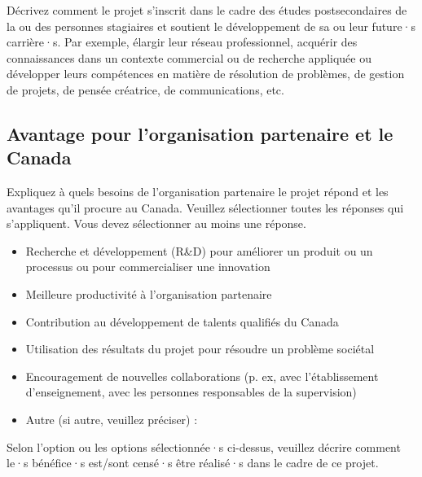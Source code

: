 \documentclass{mitacs-acceleration}
\begin{document}
\subsubsection{}\begin{instructions}
Décrivez comment le projet s'inscrit dans le cadre des études postsecondaires de la ou des personnes stagiaires et soutient le développement de sa ou leur future·s carrière·s. Par exemple, élargir leur réseau professionnel, acquérir des connaissances dans un contexte commercial ou de recherche appliquée ou développer leurs compétences en matière de résolution de problèmes, de gestion de projets, de pensée créatrice, de communications, etc.
\end{instructions}


\subsection{Avantage pour l'organisation partenaire et le Canada} %

\begin{instructions}
Expliquez à quels besoins de l'organisation partenaire le projet répond et les avantages qu'il procure au Canada. Veuillez sélectionner toutes les réponses qui s'appliquent. Vous devez sélectionner au moins une réponse.
\end{instructions}

\begin{itemize}[label=$\boxempty$]
\item Recherche et développement (R\&D) pour améliorer un produit ou un processus ou pour commercialiser une innovation 
\item Meilleure productivité à l'organisation partenaire 
\item Contribution au développement de talents qualifiés du Canada
\item Utilisation des résultats du projet pour résoudre un problème sociétal  
\item Encouragement de nouvelles collaborations (p. ex, avec l'établissement d'enseignement, avec les personnes responsables de la supervision)  
\item Autre (si autre, veuillez préciser) :
\end{itemize}

\begin{instructions}
Selon l'option ou les options sélectionnée·s ci-dessus, veuillez décrire comment le·s bénéfice·s est/sont censé·s être réalisé·s dans le cadre de ce projet.
\end{instructions}
\end{document}
